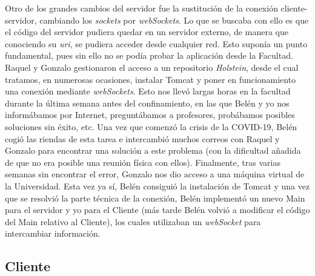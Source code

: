Otro de los grandes cambios del servidor fue la sustitución de la conexión cliente-servidor, cambiando los \textit{sockets} por \textit{webSockets}. Lo que se buscaba con ello es que el código del servidor pudiera quedar en un servidor externo, de manera que conociendo su \textit{uri}, se pudiera acceder desde cualquier red. Esto suponía un punto fundamental, pues sin ello no se podía probar la aplicación desde la Facultad. Raquel y Gonzalo gestionaron el acceso a un repositorio \textit{Holstein}, desde el cual tratamos, en numerosas ocasiones, instalar Tomcat y poner en funcionamiento una conexión mediante \textit{webSockets}. Esto nos llevó largas horas en la facultad durante la última semana antes del confinamiento, en las que Belén y yo nos informábamos por Internet, preguntábamos a profesores, probábamos posibles soluciones sin éxito, etc. Una vez que comenzó la crisis de la COVID-19, Belén cogió las riendas de esta tarea e intercambió muchos correos con Raquel y Gonzalo para encontrar una solución a este problema (con la dificultad añadida de que no era posible una reunión física con ellos). Finalmente, tras varias semanas sin encontrar el error, Gonzalo nos dio acceso a una máquina virtual de la Universidad. Esta vez ya sí, Belén consiguió la instalación de Tomcat y una vez que se resolvió la parte técnica de la conexión, Belén implementó un nuevo Main para el servidor y yo para el Cliente (más tarde Belén volvió a modificar el código del Main relativo al Cliente), los cuales utilizaban un \textit{webSocket} para intercambiar información.

\subsection{Cliente}

